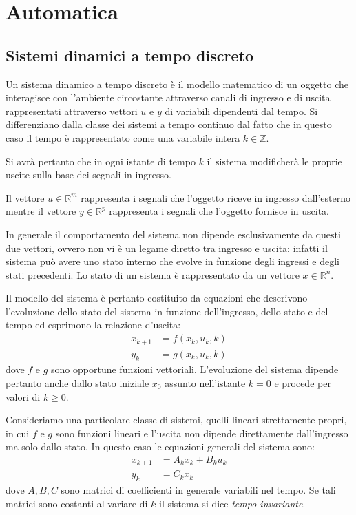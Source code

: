 \section{Automatica}
\subsection{Sistemi dinamici a tempo discreto}

Un sistema dinamico a tempo discreto è il modello matematico di un oggetto che interagisce con l’ambiente circostante attraverso canali di ingresso e di uscita rappresentati attraverso vettori $u$ e $y$ di variabili dipendenti dal tempo. Si differenziano dalla classe dei sistemi a tempo continuo dal fatto che in questo caso il tempo è rappresentato come una variabile intera $k \in \mathbb{Z}$.

Si avrà pertanto che in ogni istante di tempo $k$ il sistema modificherà le proprie uscite sulla base dei segnali in ingresso.

Il vettore $u \in \mathbb{R}^m$ rappresenta i segnali che l’oggetto riceve in ingresso dall’esterno mentre il vettore $y \in \mathbb{R}^p$ rappresenta i segnali che l’oggetto fornisce in uscita.

In generale il comportamento del sistema non dipende esclusivamente da questi due vettori, ovvero non vi è un legame diretto tra ingresso e uscita: infatti il sistema può avere uno stato interno che evolve in funzione degli ingressi e degli stati precedenti. Lo stato di un sistema è rappresentato da un vettore $x \in \mathbb{R}^n$.

Il modello del sistema è pertanto costituito da equazioni che descrivono l’evoluzione dello stato del sistema in funzione dell’ingresso, dello stato e del tempo ed esprimono la relazione d'uscita:
\begin{subequations}
\begin{align}
x_{k+1} &= f(x_k,u_k,k) \\
y_k &= g(x_k,u_k,k)
\end{align}
\end{subequations}
dove $f$ e $g$ sono opportune funzioni vettoriali.
L'evoluzione del sistema dipende pertanto anche dallo stato iniziale $x_0$ assunto nell'istante $k=0$ e procede per valori di $k \geq 0$.

Consideriamo una particolare classe di sistemi, quelli lineari strettamente propri, in cui $f$ e $g$ sono funzioni lineari e l’uscita non dipende direttamente dall’ingresso ma solo dallo stato. In questo caso le equazioni generali del sistema sono:
\begin{subequations}
\begin{align}
\label{eqstate}
x_{k+1} &= A_kx_k + B_ku_k \\
y_k &= C_kx_k
\end{align}
\end{subequations}
dove $A,B,C$ sono matrici di coefficienti in generale variabili nel tempo. Se tali matrici sono costanti al variare di $k$ il sistema si dice \textit{tempo invariante}.
\newpage

